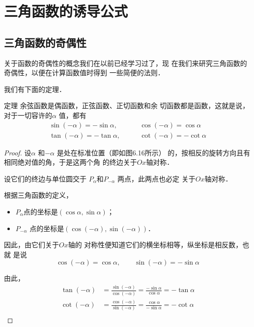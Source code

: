 \section{三角函数的诱导公式}
\subsection{三角函数的奇偶性}
关于函数的奇偶性的概念我们在以前已经学习过了，现
在我们来研究三角函数的奇偶性，以便在计算函数值时得到
一些简便的法则．

我们有下面的定理．
\begin{blk}{定理}
    余弦函数是偶函数，正弦函数、正切函数和余
    切函数都是函数，这就是说，对于一切容许的$\alpha$ 值，都有
  \begin{equation}
 \begin{split}
        \sin(-\alpha )=-\sin\alpha,&\qquad \cos(-\alpha )=\cos\alpha\\
          \tan(-\alpha )=-\tan\alpha,&\qquad  \cot(-\alpha )=-\cot\alpha
    \end{split}     
  \end{equation}  
\end{blk}

\begin{proof}
设$\alpha$ 和$-\alpha$ 是处在标准位置（即如图6.16所示）
的，按相反的旋转方向且有相同绝对值的角，于是这两个角
的终边关于$Ox$轴对称．

\begin{figure}[htp]
    \centering
{}
    \caption{}
\end{figure}


设它们的终边与单位圆交于
$P_{\alpha}$和$P_{-\alpha}$ 两点，此两点也必定
关于$Ox$轴对称．

根据三角函数的定义，
\begin{itemize}
    \item $P_{\alpha}$点的坐标是$(\cos\alpha ,\sin\alpha)$；
    \item $P_{-\alpha}$
点的坐标是$(\cos(-\alpha ),\sin(-\alpha ))$．
\end{itemize}

因此，由它们关于$Ox$轴的
对称性便知道它们的横坐标相等，纵坐标是相反数，也就
是说
\[\cos(-\alpha )=\cos\alpha ,\qquad \sin(-\alpha )= -\sin\alpha\]

由此，
\[\begin{split}
    \tan(-\alpha)&=\frac{\sin(-\alpha)}{\cos(-\alpha)}=\frac{-\sin\alpha}{\cos\alpha}=-\tan\alpha\\
    \cot(-\alpha)&=\frac{\cos(-\alpha)}{\sin(-\alpha)}=\frac{\cos\alpha}{-\sin\alpha}=-\cot\alpha\\
\end{split}\]
\end{proof}

